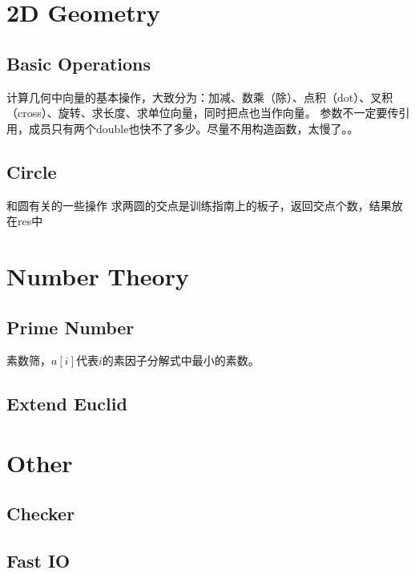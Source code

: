 \documentclass[twoside, UTF8]{article}
\begin{document}
	\section{2D Geometry}
		\subsection{Basic Operations}
			\begin{flushleft}
				计算几何中向量的基本操作，大致分为：加减、数乘（除）、点积（dot）、叉积（cross）、旋转、求长度、求单位向量，同时把点也当作向量。
				\linebreak 参数不一定要传引用，成员只有两个double也快不了多少。尽量不用构造函数，太慢了。。
			\end{flushleft}
			
		\subsection{Circle}
			\begin{flushleft}
				和圆有关的一些操作
				\linebreak 求两圆的交点是训练指南上的板子，返回交点个数，结果放在res中
			\end{flushleft}
			
	\newpage
	\section{Number Theory}
		\subsection{Prime Number}
			\begin{flushleft}
				素数筛，$a[i]$代表$i$的素因子分解式中最小的素数。
			\end{flushleft}
			
		\subsection{Extend Euclid}
			
	\newpage
	\section{Other}
		\subsection{Checker}
			
		\subsection{Fast IO}
			
\end{document}
